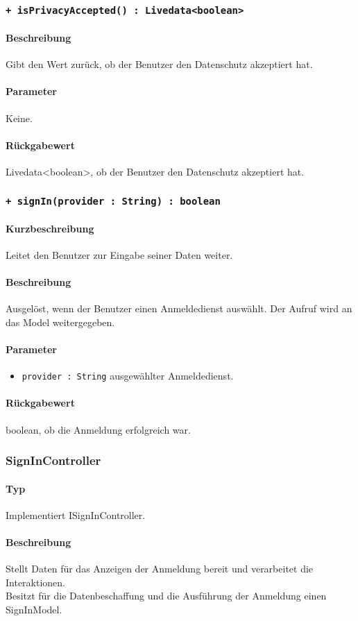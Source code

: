\subsubsection{\texttt{+ isPrivacyAccepted() : Livedata<boolean>}}%
\paragraph*{Beschreibung}
Gibt den Wert zurück, ob der Benutzer den Datenschutz akzeptiert hat.
\paragraph*{Parameter}
Keine.
\paragraph*{Rückgabewert}
Livedata<boolean>, ob der Benutzer den Datenschutz akzeptiert hat.

\subsubsection{\texttt{+ signIn(provider : String) : boolean}}%
\paragraph*{Kurzbeschreibung}
Leitet den Benutzer zur Eingabe seiner Daten weiter.
\paragraph*{Beschreibung}
Ausgelöst, wenn der Benutzer einen Anmeldedienst auswählt. 
Der Aufruf wird an das Model weitergegeben.
\paragraph*{Parameter}
\begin{itemize}
    \item \texttt{provider : String} ausgewählter Anmeldedienst.
\end{itemize}
\paragraph*{Rückgabewert}
boolean, ob die Anmeldung erfolgreich war.

\subsubsection{SignInController}
\paragraph*{Typ}
Implementiert ISignInController.
\paragraph*{Beschreibung}
Stellt Daten für das Anzeigen der Anmeldung bereit und verarbeitet die Interaktionen.\\
Besitzt für die Datenbeschaffung und die Ausführung der Anmeldung einen SignInModel.
